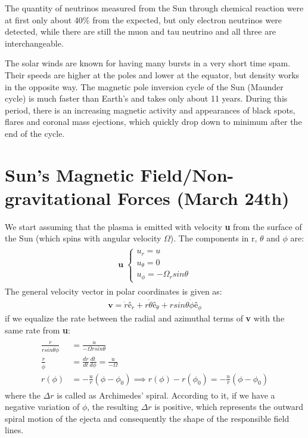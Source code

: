 \documentclass[12pt,a4paper]{article}
\begin{document}
The quantity of neutrinos measured from the Sun through chemical reaction were at first only about 40\% from the expected, but only electron neutrinos were detected, while there are still the muon and tau neutrino and all three are interchangeable.

The solar winds are known for having many bursts in a very short time spam. Their speeds are higher at the poles and lower at the equator, but density works in the opposite way. The magnetic pole inversion cycle of the Sun (Maunder cycle) is much faster than Earth's and takes only about 11 years. During this period, there is an increasing magnetic activity and appearances of black spots, flares and coronal mass ejections, which quickly drop down to minimum after the end of the cycle.
\vspace{10mm}

\section{Sun's Magnetic Field/Non-gravitational Forces (March 24th)}

We start assuming that the plasma is emitted with velocity \textbf{u} from the surface of the Sun (which spins with angular velocity $\Omega$). The components in r, $\theta$ and $\phi$ are:
\begin{align}
    \begin{split}
    \textbf{u}\;
    \begin{cases}
        u_r=u \\
        u_\theta=0 \\
        u_\phi=-\Omega_rsin\theta
        \end{cases}
    \end{split}
\end{align}
The general velocity vector in polar coordinates is given as:
\begin{align}
\label{37}
    \textbf{v}=\dot{r}ê_r+r\dot{\theta}ê_\theta+rsin\theta\dot{\phi}ê_\phi
\end{align}
if we equalize the rate between the radial and azimuthal terms of \textbf{v} with the same rate from \textbf{u}:
\begin{align}
\begin{split}
\label{38}
    \frac{\dot{r}}{rsin\theta\dot{\phi}}&=\frac{u}{-\Omega rsin\theta} \\
    \frac{\dot{r}}{\dot{\phi}}&=\frac{dr}{dt}\frac{dt}{d\phi}=\frac{u}{-\Omega} \\
    r(\phi)&=-\frac{u}{r}(\phi-\phi_0) \implies r(\phi)-r(\phi_0)=-\frac{u}{r}(\phi-\phi_0)
\end{split}
\end{align}
where the $\Delta r$ is called as Archimedes' spiral. According to it, if we have a negative variation of $\phi$, the resulting $\Delta r$ is positive, which represents the outward spiral motion of the ejecta and consequently the shape of the responsible field lines.
\end{document}

